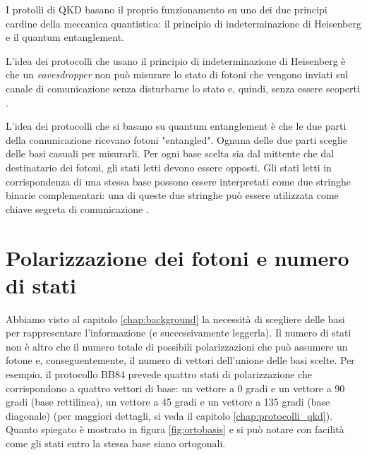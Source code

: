 I protolli di QKD basano il proprio funzionamento su uno dei due principi cardine della meccanica quantistica: il principio di indeterminazione di Heisenberg e il quantum entanglement.

L'idea dei protocolli che usano il principio di indeterminazione di Heisenberg è che un \textit{eavesdropper} non può misurare lo stato di fotoni che vengono inviati sul canale di comunicazione senza disturbarne lo stato e, quindi, senza essere scoperti \cite{survey_prominent_qkd}.

L'idea dei protocolli che si basano su quantum entanglement è che le due parti della comunicazione ricevano fotoni "entangled". Ognuna delle due parti sceglie delle basi casuali per misurarli. Per ogni base scelta sia dal mittente che dal destinatario dei fotoni, gli stati letti devono essere opposti. Gli stati letti in corrispondenza di una stessa base possono essere interpretati come due stringhe binarie complementari: una di queste due stringhe può essere utilizzata come chiave segreta di comunicazione \cite{survey_prominent_qkd} \cite{survey_qc}.

\section{Polarizzazione dei fotoni e numero di stati}

Abbiamo visto al capitolo \ref{chap:background} la necessità di scegliere delle basi per rappresentare l'informazione (e successivamente leggerla). Il numero di stati non è altro che il numero totale di possibili polarizzazioni che può assumere un fotone e, conseguentemente, il numero di vettori dell'unione delle basi scelte. Per esempio, il protocollo BB84 prevede quattro stati di polarizzazione che corrispondono a quattro vettori di base: un vettore a 0 gradi e un vettore a 90 gradi (base rettilinea), un vettore a 45 gradi e un vettore a 135 gradi (base diagonale) \cite{survey_qc_qkd} \cite{survey_qkd} \cite{security_individual_realistic_qkd} (per maggiori dettagli, si veda il capitolo \ref{chap:protocolli_qkd}). Quanto spiegato è mostrato in figura \ref{fig:ortobasis} e si può notare con facilità come gli stati entro la stessa base siano ortogonali.



